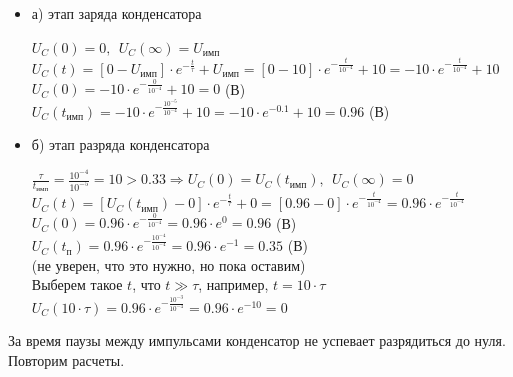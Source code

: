 \begin{itemize}
\item[] а) этап заряда конденсатора

		$U_C(0) = 0,\ \ U_C(\infty) = U_\text{имп}$\\	
		$U_C(t) = [0 - U_\text{имп}] \cdot e^{-\frac{t}{\tau}} + U_\text{имп} = [0 - 10] \cdot e^{-\frac{t}{10^{-4}}} + 10 = -10 \cdot e^{-\frac{t}{10^{-4}}} + 10$\\
		$U_C(0) = -10 \cdot e^{-\frac{0}{10^{-4}}} + 10 = 0$ (В)\\
		$U_C(t_\text{имп}) = -10 \cdot e^{-\frac{10^{-5}}{10^{-4}}} + 10 = -10 \cdot e^{-0.1} + 10 = 0.96$ (В)\\
		
\item[] б) этап разряда конденсатора
	
		$\frac{\tau}{t_\text{имп}} = \frac{10^{-4}}{10^{-5}} = 10 > 0.33 \Rightarrow U_C(0) = U_C(t_\text{имп}),\ \ U_C(\infty) = 0$\\
		$U_C(t) = [U_C(t_\text{имп}) - 0] \cdot e^{-\frac{t}{\tau}} + 0 =  [0.96 - 0] \cdot e^{-\frac{t}{10^{-4}}} = 0.96 \cdot e^{-\frac{t}{10^{-4}}}$\\
		$U_C(0) = 0.96 \cdot e^{-\frac{0}{10^{-4}}} = 0.96 \cdot e^0 = 0.96$ (В)\\
		$U_C(t_\text{п}) = 0.96 \cdot e^{-\frac{10^{-4}}{10^{-4}}} = 0.96 \cdot e^{-1} = 0.35$ (В)\\
		(не уверен, что это нужно, но пока оставим)\\
		Выберем такое $t$, что $t \gg \tau$, например, $t = 10 \cdot \tau$ \\
		$U_C( 10 \cdot \tau) = 0.96 \cdot e^{-\frac{10^{-3}}{10^{-4}}} = 0.96 \cdot e^{-10} = 0$	
		
\end{itemize}

	За время паузы между импульсами конденсатор не успевает разрядиться до нуля. Повторим расчеты.	
	
